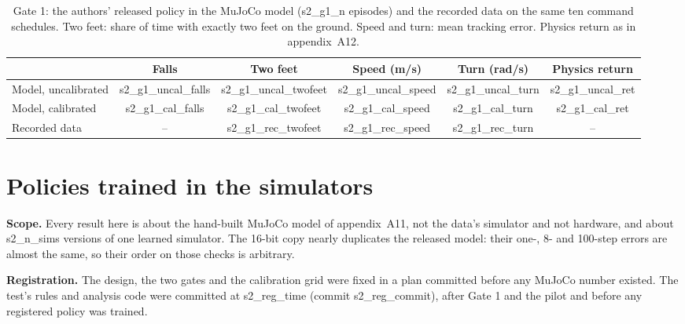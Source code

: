 \begin{table}[h]
\centering
\caption{Gate 1: the authors' released policy in the MuJoCo model ({{s2_g1_n}} episodes) and the recorded data on the
same ten command schedules. Two feet: share of time with exactly two feet on the ground. Speed and turn: mean
tracking error. Physics return as in appendix~A12.}
\label{tab:app-s2gate}
\footnotesize
\begin{tabular}{@{}lccccc@{}}
\toprule
 & Falls & Two feet & Speed (m/s) & Turn (rad/s) & Physics return \\
\midrule
Model, uncalibrated & {{s2_g1_uncal_falls}} & {{s2_g1_uncal_twofeet}} & {{s2_g1_uncal_speed}} & {{s2_g1_uncal_turn}} & {{s2_g1_uncal_ret}} \\
Model, calibrated & {{s2_g1_cal_falls}} & {{s2_g1_cal_twofeet}} & {{s2_g1_cal_speed}} & {{s2_g1_cal_turn}} & {{s2_g1_cal_ret}} \\
Recorded data & -- & {{s2_g1_rec_twofeet}} & {{s2_g1_rec_speed}} & {{s2_g1_rec_turn}} & -- \\
\bottomrule
\end{tabular}
\end{table}

\FloatBarrier
\section{Policies trained in the simulators}\label{app:A12}
\textbf{Scope.} Every result here is about the hand-built MuJoCo model of appendix~A11, not the data's simulator and
not hardware, and about {{s2_n_sims}} versions of one learned simulator. The 16-bit copy nearly duplicates the released
model: their one-, 8- and 100-step errors are almost the same, so their order on those checks is arbitrary.

\textbf{Registration.} The design, the two gates and the calibration grid were fixed in a plan committed before any
MuJoCo number existed. The test's rules and analysis code were committed at {{s2_reg_time}} (commit
{{s2_reg_commit}}), after Gate 1 and the pilot and before any registered policy was trained.

